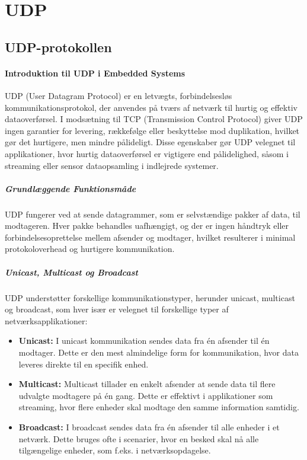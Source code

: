 \chapter{UDP}
\section{UDP-protokollen}
\subsubsection*{Introduktion til UDP i Embedded Systems}
UDP (User Datagram Protocol) er en letvægts, forbindelsesløs kommunikationsprotokol, der anvendes på tværs af netværk til hurtig og effektiv dataoverførsel. I modsætning til TCP (Transmission Control Protocol) giver UDP ingen garantier for levering, rækkefølge eller beskyttelse mod duplikation, hvilket gør det hurtigere, men mindre pålideligt. Disse egenskaber gør UDP velegnet til applikationer, hvor hurtig dataoverførsel er vigtigere end pålidelighed, såsom i streaming eller sensor dataopsamling i indlejrede systemer.

\paragraph{Grundlæggende Funktionsmåde}
UDP fungerer ved at sende datagrammer, som er selvstændige pakker af data, til modtageren. Hver pakke behandles uafhængigt, og der er ingen håndtryk eller forbindelsesoprettelse mellem afsender og modtager, hvilket resulterer i minimal protokoloverhead og hurtigere kommunikation.

\paragraph{Unicast, Multicast og Broadcast}
UDP understøtter forskellige kommunikationstyper, herunder unicast, multicast og broadcast, som hver især er velegnet til forskellige typer af netværksapplikationer:

\begin{itemize}
	\item \textbf{Unicast:} I unicast kommunikation sendes data fra én afsender til én modtager. Dette er den mest almindelige form for kommunikation, hvor data leveres direkte til en specifik enhed.
	\item \textbf{Multicast:} Multicast tillader en enkelt afsender at sende data til flere udvalgte modtagere på én gang. Dette er effektivt i applikationer som streaming, hvor flere enheder skal modtage den samme information samtidig.
	\item \textbf{Broadcast:} I broadcast sendes data fra én afsender til alle enheder i et netværk. Dette bruges ofte i scenarier, hvor en besked skal nå alle tilgængelige enheder, som f.eks. i netværksopdagelse.
\end{itemize}

